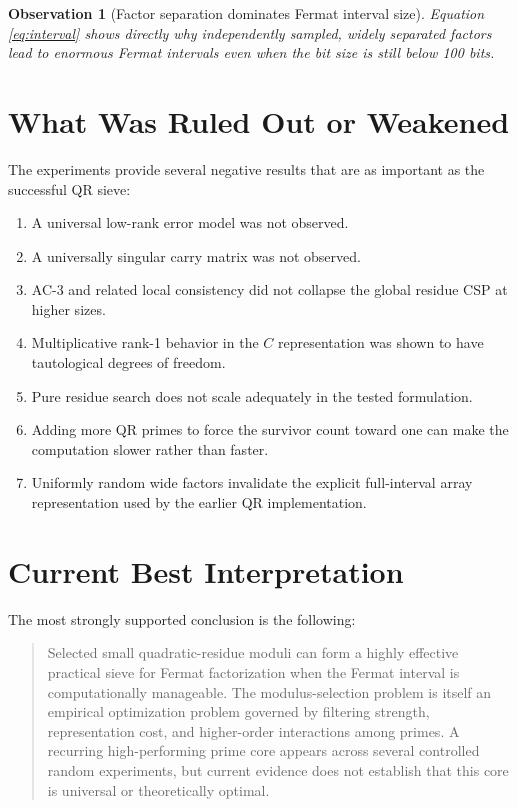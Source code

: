 \documentclass[11pt,a4paper]{article}
\newtheorem{observation}{Observation}
\begin{document}
\begin{observation}[Factor separation dominates Fermat interval size]
Equation \eqref{eq:interval} shows directly why independently sampled, widely separated factors lead to enormous Fermat intervals even when the bit size is still below 100 bits.
\end{observation}

\section{What Was Ruled Out or Weakened}

The experiments provide several negative results that are as important as the successful QR sieve:

\begin{enumerate}[leftmargin=2em]
\item A universal low-rank error model was not observed.
\item A universally singular carry matrix was not observed.
\item AC-3 and related local consistency did not collapse the global residue CSP at higher sizes.
\item Multiplicative rank-1 behavior in the $C$ representation was shown to have tautological degrees of freedom.
\item Pure residue search does not scale adequately in the tested formulation.
\item Adding more QR primes to force the survivor count toward one can make the computation slower rather than faster.
\item Uniformly random wide factors invalidate the explicit full-interval array representation used by the earlier QR implementation.
\end{enumerate}

\section{Current Best Interpretation}

The most strongly supported conclusion is the following:

\begin{quote}
Selected small quadratic-residue moduli can form a highly effective practical sieve for Fermat factorization when the Fermat interval is computationally manageable. The modulus-selection problem is itself an empirical optimization problem governed by filtering strength, representation cost, and higher-order interactions among primes. A recurring high-performing prime core appears across several controlled random experiments, but current evidence does not establish that this core is universal or theoretically optimal.
\end{quote}
\end{document}

